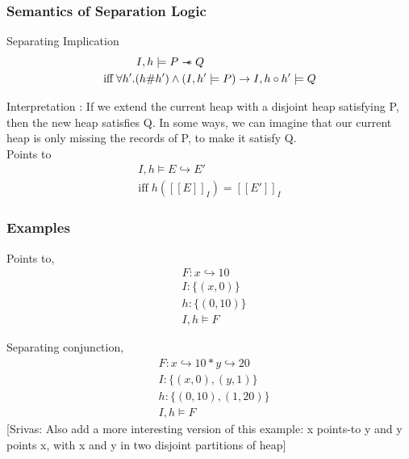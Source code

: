 \documentclass{beamer}
\newcommand\sepimp{\mathrel{-\mkern-6mu*}}
\newcommand{\mscmt}[1]{{\color{blue} [Srivas: {#1}]}}
\begin{document}
\begin{frame}
\frametitle{Semantics of Separation Logic}

Separating Implication
\begin{align*}
    I,h \models P \sepimp Q \hspace{3.5cm} \\ 
    \textrm{iff} \; \forall h'.(h \# h') \land (I,h' \models P) \to I,h \circ h' \models Q
\end{align*}

Interpretation : If we extend the current heap with a disjoint heap satisfying P, then the new heap satisfies Q. In some ways, we can imagine that our current heap is only missing the records of P, to make it satisfy Q.
\vspace{0.5cm} \\

Points to
\begin{align*}
    I,h \models E \hookrightarrow E' \\ 
    \textrm{iff} \; h([\![ E ]\!]_I) = [\![ E' ]\!]_I
\end{align*}
\end{frame}

\begin{frame}
\frametitle{Examples}
Points to, 
\begin{align*}
    & F : x \hookrightarrow 10 \\
    & I : \{(x,0)\} \\
    & h : \{(0,10)\} \\
    & I,h \models F
\end{align*}

Separating conjunction,
\begin{align*}
    & F : x \hookrightarrow 10 * y \hookrightarrow 20 \\
    & I : \{ (x,0), (y,1) \} \\
    & h : \{(0,10), (1,20)\} \\
    & I,h \models F
\end{align*}
\mscmt{\tiny{Also add a more interesting version of this example: x points-to y and y points x, with x and y in two disjoint partitions of heap}}

\end{frame}
\end{document}
